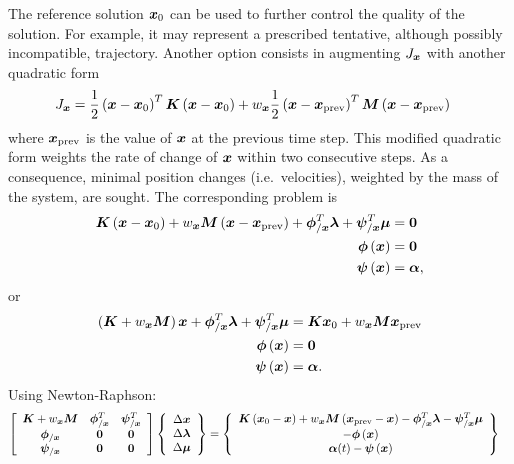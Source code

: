 The reference solution $\T{x}_0$ can be used to further control
the quality of the solution.
For example, it may represent a prescribed tentative,
although possibly incompatible, trajectory.
Another option consists in augmenting $J_{\T{x}}$
with another quadratic form
\begin{align}
	J_{\T{x}}
	&=
	\frac{1}{2} \plbr{\T{x} - \T{x}_0}^T \TT{K} \plbr{\T{x} - \T{x}_0}
	+
	w_{\T{x}} \frac{1}{2} \plbr{\T{x} - \T{x}_\text{prev}}^T \TT{M} \plbr{\T{x} - \T{x}_\text{prev}}
\end{align}
where $\T{x}_\text{prev}$ is the value of $\T{x}$ at the previous time step.
This modified quadratic form weights the rate of change of $\T{x}$ within
two consecutive steps.
As a consequence, minimal position changes (i.e.\ velocities),
weighted by the mass of the system, are sought.
The corresponding problem is
\begin{subequations}
\begin{align}
	\TT{K} \plbr{\T{x} - \T{x}_0}
	+
	w_{\T{x}} \TT{M} \plbr{\T{x} - \T{x}_\text{prev}}
	+
	\T{\phi}_{/\T{x}}^T \T{\lambda}
	+
	\T{\psi}_{/\T{x}}^T \T{\mu}
	&=
	\T{0}
	\\
	\T{\phi}\plbr{\T{x}}
	&=
	\T{0}
	\\
	\T{\psi}\plbr{\T{x}}
	&=
	\T{\alpha}
	,
\end{align}
\end{subequations}
or
\begin{subequations}
\begin{align}
	\plbr{\TT{K} + w_{\T{x}} \TT{M}} \T{x}
	+
	\T{\phi}_{/\T{x}}^T \T{\lambda}
	+
	\T{\psi}_{/\T{x}}^T \T{\mu}
	&=
	\TT{K} \T{x}_0 + w_{\T{x}} \TT{M} \T{x}_\text{prev}
	\\
	\T{\phi}\plbr{\T{x}}
	&=
	\T{0}
	\\
	\T{\psi}\plbr{\T{x}}
	&=
	\T{\alpha}
	.
\end{align}
\end{subequations}
Using Newton-Raphson:
\begin{align}
	\sqbr{\matr{ccc}{
		\TT{K} + w_{\T{x}} \TT{M} & \T{\phi}_{/\T{x}}^T & \T{\psi}_{/\T{x}}^T
		\\
		\T{\phi}_{/\T{x}} & \TT{0} & \TT{0}
		\\
		\T{\psi}_{/\T{x}} & \TT{0} & \TT{0}
	}} \cubr{\cvvect{
		\Delta\T{x}
		\\
		\Delta\T{\lambda}
		\\
		\Delta\T{\mu}
	}}
	&=
	\cubr{\cvvect{
		\TT{K} \plbr{\T{x}_0 - \T{x}}
		+
		w_{\T{x}} \TT{M} \plbr{\T{x}_\text{prev} - \T{x}}
		-
		\T{\phi}_{/\T{x}}^T \T{\lambda}
		-
		\T{\psi}_{/\T{x}}^T \T{\mu}
		\\
		-\T{\phi}\plbr{\T{x}}
		\\
		\T{\alpha}(t)
		-
		\T{\psi}\plbr{\T{x}}
	}}
\end{align}

